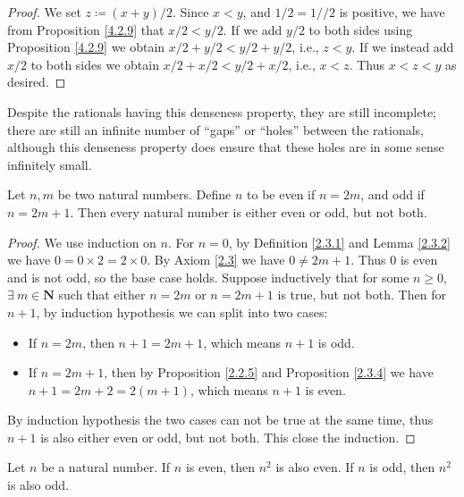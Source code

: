\begin{proof}
    We set \(z \coloneqq (x + y) / 2\).
    Since \(x < y\), and \(1 / 2 = 1 // 2\) is positive, we have from Proposition \ref{4.2.9} that \(x / 2 < y / 2\).
    If we add \(y / 2\) to both sides using Proposition \ref{4.2.9} we obtain \(x / 2 + y / 2 < y / 2 + y / 2\), i.e., \(z < y\).
    If we instead add \(x / 2\) to both sides we obtain \(x / 2 + x / 2 < y / 2 + x / 2\), i.e., \(x < z\).
    Thus \(x < z < y\) as desired.
\end{proof}

\begin{note}
    Despite the rationals having this denseness property, they are still incomplete;
    there are still an infinite number of ``gaps'' or ``holes'' between the rationals, although this denseness property does ensure that these holes are in some sense infinitely small.
\end{note}

\begin{additional corollary}\label{ac 4.4.2}
Let \(n, m\) be two natural numbers.
Define \(n\) to be even if \(n = 2m\), and odd if \(n = 2m + 1\).
Then every natural number is either even or odd, but not both.
\end{additional corollary}

\begin{proof}
    We use induction on \(n\).
    For \(n = 0\), by Definition \ref{2.3.1} and Lemma \ref{2.3.2} we have \(0 = 0 \times 2 = 2 \times 0\).
    By Axiom \ref{2.3} we have \(0 \neq 2m + 1\).
    Thus \(0\) is even and is not odd, so the base case holds.
    Suppose inductively that for some \(n \geq 0\), \(\exists\ m \in \mathbf{N}\) such that either \(n = 2m\) or \(n = 2m + 1\) is true, but not both.
    Then for \(n + 1\), by induction hypothesis we can split into two cases:
    \begin{itemize}
        \item If \(n = 2m\), then \(n + 1 = 2m + 1\), which means \(n + 1\) is odd.
        \item If \(n = 2m + 1\), then by Proposition \ref{2.2.5} and Proposition \ref{2.3.4} we have \(n + 1 = 2m + 2 = 2(m + 1)\), which means \(n + 1\) is even.
    \end{itemize}
    By induction hypothesis the two cases can not be true at the same time, thus \(n + 1\) is also either even or odd, but not both.
    This close the induction.
\end{proof}

\begin{additional corollary}\label{ac 4.4.3}
Let \(n\) be a natural number.
If \(n\) is even, then \(n^2\) is also even.
If \(n\) is odd, then \(n^2\) is also odd.
\end{additional corollary}

